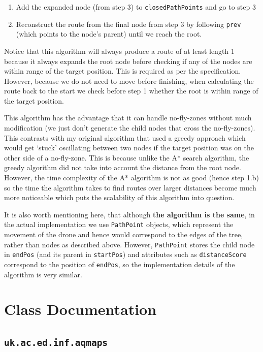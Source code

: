 \documentclass[11pt]{article}
\begin{document}
\begin{enumerate}[topsep=0pt, itemsep=0pt]
  \item Add the expanded node (from step 3) to \texttt{closedPathPoints} and go to step 3

  \item Reconstruct the route from the final node from step 3 by following \texttt{prev} (which points to the node's parent) until we reach the root.
\end{enumerate}

Notice that this algorithm will always produce a route of at least length 1 because it always expands the root node before checking if any of the nodes are within range of the target position. This is required as per the specification. However, because we do not need to move before finishing, when calculating the route back to the start we check before step 1 whether the root is within range of the target position.

This algorithm has the advantage that it can handle no-fly-zones without much modification (we just don't generate the child nodes that cross the no-fly-zones). This contrasts with my original algorithm that used a greedy approach which would get `stuck' oscillating between two nodes if the target position was on the other side of a no-fly-zone. This is because unlike the A* search algorithm, the greedy algorithm did not take into account the distance from the root node. However, the time complexity of the A* algorithm is not as good (hence step 1.b) so the time the algorithm takes to find routes over larger distances become much more noticeable which puts the scalability of this algorithm into question.

It is also worth mentioning here, that although \textbf{the algorithm is the same}, in the actual implementation we use \texttt{PathPoint} objects, which represent the movement of the drone and hence would correspond to the edges of the tree, rather than nodes as described above. However, \texttt{PathPoint} stores the child node in \texttt{endPos} (and its parent in \texttt{startPos}) and attributes such as \texttt{distanceScore} correspond to the position of \texttt{endPos}, so the implementation details of the algorithm is very similar.

\section{Class Documentation}

\subsection{\texttt{uk.ac.ed.inf.aqmaps}}
\end{document}

